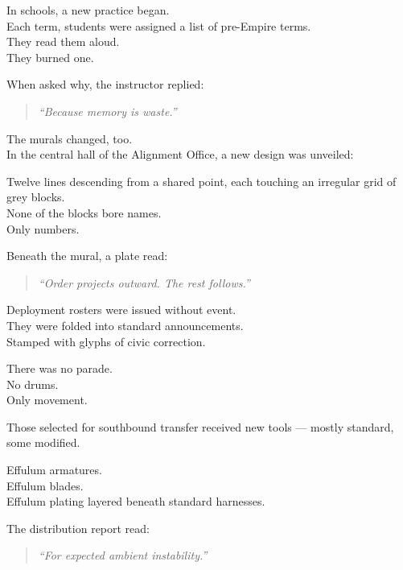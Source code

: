 \documentclass[12pt]{article}
\begin{document}
\vspace{1em}

In schools, a new practice began.\\
Each term, students were assigned a list of pre-Empire terms.\\
They read them aloud.\\
They burned one.

When asked why, the instructor replied:

\begin{quote}
\textit{“Because memory is waste.”}
\end{quote}

\vspace{1em}

The murals changed, too.\\
In the central hall of the Alignment Office, a new design was unveiled:

Twelve lines descending from a shared point, each touching an irregular grid of grey blocks.\\
None of the blocks bore names.\\
Only numbers.

Beneath the mural, a plate read:

\begin{quote}
\textit{“Order projects outward. The rest follows.”}
\end{quote}

\vspace{1em}

Deployment rosters were issued without event.\\
They were folded into standard announcements.\\
Stamped with glyphs of civic correction.

There was no parade.\\
No drums.\\
Only movement.

Those selected for southbound transfer received new tools — mostly standard, some modified.

Effulum armatures.\\
Effulum blades.\\
Effulum plating layered beneath standard harnesses.

The distribution report read:

\begin{quote}
\textit{“For expected ambient instability.”}
\end{quote}
\end{document}
